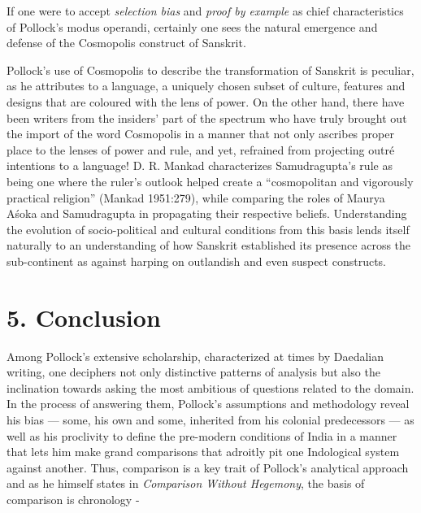 If one were to accept \textit{selection bias} and \textit{proof by example} as chief characteristics of Pollock’s modus operandi, certainly one sees the natural emergence and defense of the Cosmopolis construct of Sanskrit.

\newpage

Pollock’s use of Cosmopolis to describe the transformation of Sanskrit is peculiar, as he attributes to a language, a uniquely chosen subset of culture, features and designs that are coloured with the lens of power. On the other hand, there have been writers from the insiders’ part of the spectrum who have truly brought out the import of the word Cosmopolis in a manner that not only ascribes proper place to the lenses of power and rule, and yet, refrained from projecting outré intentions to a language! D. R. Mankad characterizes Samudragupta’s rule as being one where the ruler’s outlook helped create a “cosmopolitan and vigorously practical religion” (Mankad 1951:279), while comparing the roles of Maurya Aśoka and Samudragupta in propagating their respective beliefs. Understanding the evolution of socio-political and cultural conditions from this basis lends itself naturally to an understanding of how Sanskrit established its presence across the sub-continent as against harping on outlandish and even suspect constructs.


\vspace{-.3cm}

\section*{5. Conclusion}

Among Pollock’s extensive scholarship, characterized at times by Daedalian writing, one deciphers not only distinctive patterns of analysis but also the inclination towards asking the most ambitious of questions related to the domain. In the process of answering them, Pollock’s assumptions and methodology reveal his bias — some, his own and some, inherited from his colonial predecessors — as well as his proclivity to define the pre-modern conditions of India in a manner that lets him make grand comparisons that adroitly pit one Indological system against another. Thus, comparison is a key trait of Pollock’s analytical approach and as he himself states in \textit{Comparison Without Hegemony}, the basis of comparison is chronology -

